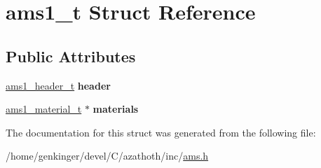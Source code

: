 \hypertarget{structams1__t}{}\section{ams1\+\_\+t Struct Reference}
\label{structams1__t}
\subsection*{Public Attributes}
\begin{DoxyCompactItemize}
\item 
\mbox{\label{structams1__t_ae65410a21c015b4054106adc38274c75}} 
\mbox{\hyperlink{structams1__header__t}{ams1\+\_\+header\+\_\+t}} {\bfseries header}
\item 
\mbox{\label{structams1__t_a22d081660fc17cde00f3fc25cb308171}} 
\mbox{\hyperlink{structams1__material__t}{ams1\+\_\+material\+\_\+t}} $\ast$ {\bfseries materials}
\end{DoxyCompactItemize}


The documentation for this struct was generated from the following file\+:\begin{DoxyCompactItemize}
\item 
/home/genkinger/devel/\+C/azathoth/inc/\mbox{\hyperlink{ams_8h}{ams.\+h}}\end{DoxyCompactItemize}
